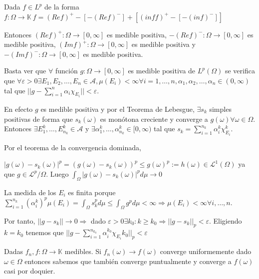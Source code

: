 \documentclass[11pt, a4paper]{article}
\makeatletter
\newif\IfInSansMode
\let\oldsf\sffamily
\renewcommand*{\sffamily}{\oldsf\mathversion{sans}\InSansModetrue}
\let\oldnorm\normalfont
\renewcommand*{\normalfont}{\oldnorm\InSansModefalse\mathversion{normal}}
\renewenvironment{proof}[1][\proofname] {\par\pushQED{\qed}\normalfont\topsep6\p@\@plus6\p@\relax\trivlist\item[\hskip\labelsep\itshape\sffamily#1\@addpunct{.}]\ignorespaces}{\popQED\endtrivlist\@endpefalse}
\theoremstyle{theorem-style}
\theoremstyle{definition-style}
\theoremstyle{remark-style}
\theoremstyle{example-style}
\makeatother
\begin{document}
\begin{proof}
  Dada $f \in L^{p}$ de la forma $f: \Omega \rightarrow \mathbb K \ f =
  (Ref)^{+} - [-(Ref)^{-}] + [(inf f)^{+}- [-(inf)^{-}]]$

  Entonces $(Ref)^{+}: \Omega \rightarrow [0, \infty]$ es medible positiva,
  $-(Ref)^{-}: \Omega \rightarrow [0, \infty]$ es medible positiva, $(Imf)^{+}:
  \Omega \rightarrow [0, \infty]$ es medible positiva y $-(Imf)^{-}: \Omega
  \rightarrow [0, \infty]$ es medible positiva.

  Basta ver que $\forall$ función $g: \Omega \rightarrow [0, \infty]$ es medible
  positiva de $L^{p}(\Omega)$ se verifica que $\forall \varepsilon > 0 \exists
  E_{1}, E_{2}, \hdots,E_{n} \in \mathscr A, \mu(E_{i}) < \infty \forall i = 1,
  \hdots, n, \alpha_{1}, \alpha_{2}, \hdots, \alpha_{n} \in (0, \infty)$ tal que
  $||g - \sum_{i=1}^{n} \alpha_{i}\chi_{E_{i}}|| < \varepsilon$.

  En efecto $g$ es medible positiva y por el Teorema de Lebesgue, $\exists
  {s_{k}}$ simples positivas de forma que $s_{k}(\omega)$ es monótona creciente
  y converge a $g(\omega) \forall \omega \in \Omega$. Entonces $\exists
  E_{1}^{k}, \hdots, E_{n_{k}}^{k} \in \mathscr A$ y $\exists \alpha_{1}^{k},
  \hdots, \alpha_{n_{k}}^{k} \in [0, \infty)$ tal que $s_{k} =
  \sum_{i=1}^{n_{k}}\alpha_{i}^{k}\chi_{E_{i}}^{k}$.

  Por el teorema de la convergencia dominada,

  $|g(\omega) - s_{k}(\omega)|^{p} = (g(\omega) - s_{k}(\omega))^{p} \leq
  g(\omega)^{p}:= h(\omega) \in \mathcal L^{1}(\Omega)$ ya que $g \in \mathcal
  L^{p}/\Omega$. Luego $\int_{\Omega}|g(\omega) - s_{k}(\omega)|^{p}d\mu
  \rightarrow 0$

  La medida de los $E_{i}$ es finita porque
  $\sum_{i=1}^{n_{k}}(\alpha_{i}^{k})^{p}\mu(E_{i}) = \int_{\Omega}s_{k}^{p}d\mu
  \leq \int_{\Omega}g^{p}d\mu < \infty \Rightarrow \mu(E_{i}) < \infty \forall
  i, \hdots, n$.

  Por tanto, $||g-s_{k}|| \rightarrow 0 \Rightarrow$ dado $\varepsilon > 0
  \exists k_{0} : k  \geq k_{0} \Rightarrow ||g-s_{k}||_{p} <
  \varepsilon$. Eligiendo $k = k_{0}$ tenemos que $||g -
  \sum_{i=1}^{n_{k_{0}}}\alpha_{i}^{k_{0}}\chi_{E_{i}}k_{0}||_{p} < \varepsilon$
\end{proof}

Dadas $f_{n}, f : \Omega \rightarrow \mathbb K$ medibles. Si ${f_{n}(\omega)}
\rightarrow f(\omega)$ converge uniformemente dado $\omega \in \Omega$ entonces
sabemos que también converge puntualmente y converge a $f(\omega)$ casi por
doquier.
\end{document}
